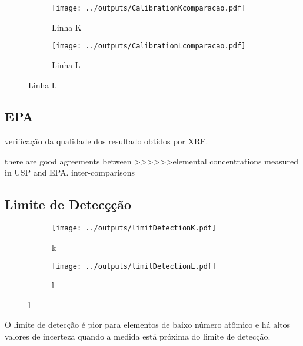 \begin{figure}[H]
  \caption{Calibrações de Fluorescência de Raiox X em 3 períodos \label{fig:compara_calibracao}}
  \begin{subfigure}[b]{0.5\textwidth}
    \texttt{[image: ../outputs/CalibrationKcomparacao.pdf]}
    \caption{Linha K}
  \end{subfigure}%
  \begin{subfigure}[b]{0.5\textwidth}
    \texttt{[image: ../outputs/CalibrationLcomparacao.pdf]}
    \caption{Linha L}
  \end{subfigure}
\end{figure}

\subsection{EPA}

verificação da qualidade dos resultado obtidos por XRF.

there are good agreements between
>>>>>>elemental concentrations measured in USP and EPA. 
inter-comparisons

\subsection{Limite de Detecçção}



\begin{figure}[H]
  \caption{}
  \begin{subfigure}[b]{0.5\textwidth}
    \texttt{[image: ../outputs/limitDetectionK.pdf]}
    \caption{k}
  \end{subfigure}%
  \begin{subfigure}[b]{0.5\textwidth}
    \texttt{[image: ../outputs/limitDetectionL.pdf]}
    \caption{l}
  \end{subfigure}
\end{figure}

O limite de detecção é pior para elementos de baixo número atômico e há
altos valores de incerteza quando a medida está próxima do limite de detecção.
